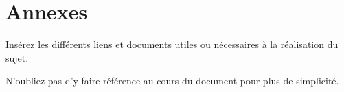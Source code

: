 \section{Annexes}
Insérez les différents liens et documents utiles ou nécessaires à la réalisation du sujet.

N'oubliez pas d'y faire référence au cours du document pour plus de simplicité.